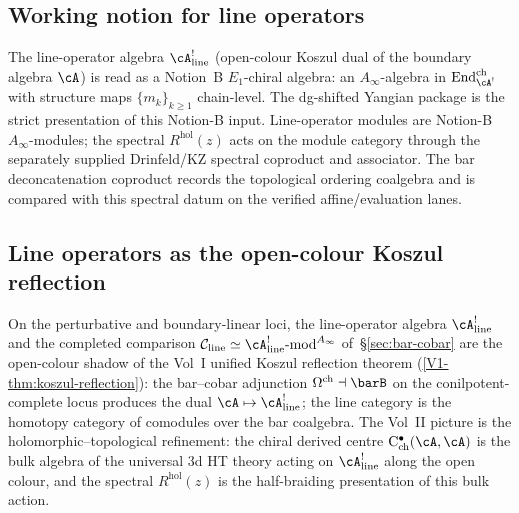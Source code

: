 \subsection{Working notion for line operators}
\label{subsec:line-operators-working-notion}

\begin{convention}
\label{conv:line-operators-notion-b}
The line-operator algebra $\cA^!_{\mathrm{line}}$ (open-colour
Koszul dual of the boundary algebra $\cA$) is read as a Notion~B
$E_1$-chiral algebra: an $A_\infty$-algebra in
$\mathrm{End}^{\mathrm{ch}}_{\cA^!}$ with structure maps
$\{m_k\}_{k\ge 1}$ chain-level. The dg-shifted Yangian package is
the strict presentation of this Notion-B input. Line-operator
modules are Notion-B $A_\infty$-modules; the spectral
$R^{\mathrm{hol}}(z)$ acts on the module category through the
separately supplied Drinfeld/KZ spectral coproduct and associator.
The bar deconcatenation coproduct records the topological ordering
coalgebra and is compared with this spectral datum on the verified
affine/evaluation lanes.
\end{convention}

\subsection{Line operators as the open-colour Koszul reflection}
\label{subsec:line-operators-koszul-reflection-anchor}

\begin{remark}
\label{rem:line-operators-koszul-reflection}
On the perturbative and boundary-linear loci, the line-operator
algebra $\cA^!_{\mathrm{line}}$ and the completed comparison
$\mathcal{C}_{\mathrm{line}} \simeq
\cA^!_{\mathrm{line}}\text{-mod}^{A_\infty}$
of~\S\ref{sec:bar-cobar} are the open-colour shadow of the Vol~I
unified Koszul reflection theorem (\cref{V1-thm:koszul-reflection}):
the bar--cobar adjunction $\Omega^{\mathrm{ch}} \dashv \barB$ on the
conilpotent-complete locus produces the dual
$\cA \mapsto \cA^!_{\mathrm{line}}$; the line category is the
homotopy category of comodules over the bar coalgebra. The Vol~II
picture is the holomorphic--topological refinement: the chiral
derived centre $\mathrm{C}^\bullet_{\mathrm{ch}}(\cA,\cA)$ is the
bulk algebra of the universal $3$d HT theory acting on
$\cA^!_{\mathrm{line}}$ along the open colour, and the spectral
$R^{\mathrm{hol}}(z)$ is the half-braiding presentation of this
bulk action.
\end{remark}

